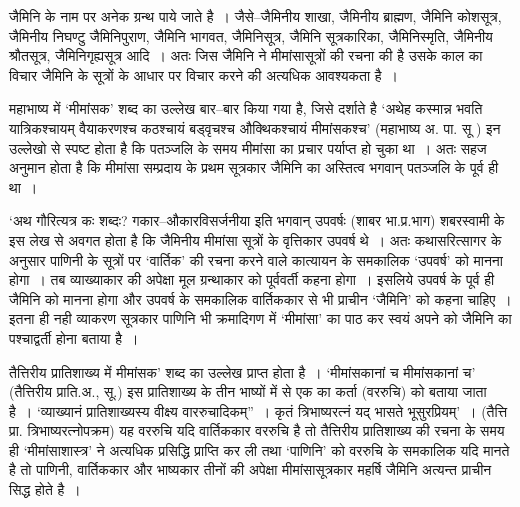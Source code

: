 जैमिनि के नाम पर अनेक ग्रन्थ पाये जाते है~। जैसे–जैमिनीय शाखा, जैमिनीय ब्राह्मण, जैमिनि कोशसूत्र, जैमिनीय निघण्टु जैमिनिपुराण, जैमिनि भागवत, जैमिनिसूत्र, जैमिनि सूत्रकारिका, जैमिनिस्मृति, जैमिनीय श्रौतसूत्र, जैमिनिगृह्यसूत्र आदि~। अतः जिस जैमिनि ने मीमांसासूत्रों की रचना की है उसके काल का विचार जैमिनि के सूत्रों के आधार पर विचार करने की अत्यधिक आवश्यकता है~। 

महाभाष्य में ‘मीमांसक' शब्द का उल्लेख बार–बार किया गया है, जिसे दर्शाते है ‘अथेह कस्मान्न भवति यात्रिकश्चायम् वैयाकरणश्च कठश्चायं बड्वृचश्च औक्थिकश्चायं मीमांसकश्च' (महाभाष्य अ. पा. सू ) इन उल्लेखो से स्पष्ट होता है कि पतञ्जलि के समय मीमांसा का प्रचार पर्याप्त हो चुका था~। अतः सहज अनुमान होता है कि मीमांसा सम्प्रदाय के प्रथम सूत्रकार जैमिनि का अस्तित्व भगवान् पतञ्जलि के पूर्व ही था~।

‘अथ गौरित्यत्र कः शब्दः? गकार–औकारविसर्जनीया इति भगवान् उपवर्षः (शाबर भा.प्र.भाग) शबरस्वामी के इस लेख से अवगत होता है कि जैमिनीय मीमांसा सूत्रों के वृत्तिकार उपवर्ष थे~। अतः कथासरित्सागर के अनुसार पाणिनी के सूत्रों पर ‘वार्तिक' की रचना करने वाले कात्यायन के समकालिक ‘उपवर्ष' को मानना होगा~। तब व्याख्याकार की अपेक्षा मूल ग्रन्थाकार को पूर्ववर्ती कहना होगा~। इसलिये उपवर्ष के पूर्व ही जैमिनि को मानना होगा और उपवर्ष के समकालिक वार्तिककार से भी प्राचीन ‘जैमिनि' को कहना चाहिए~। इतना ही नही व्याकरण सूत्रकार पाणिनि भी क्रमादिगण में ‘मीमांसा' का पाठ कर स्वयं अपने को जैमिनि का पश्चाद्वर्ती होना बताया है~।

तैत्तिरीय प्रातिशाख्य में मीमांसक' शब्द का उल्लेख प्राप्त होता है~। ‘मीमांसकानां च मीमांसकानां च' (तैत्तिरीय प्राति.अ., सू.) इस प्रातिशाख्य के तीन भाष्यों में से एक का कर्ता (वररुचि) को बताया जाता है~। ‘व्याख्यानं प्रातिशाख्यस्य वीक्ष्य वाररुचादिकम्”~। कृतं त्रिभाष्यरत्नं यद् भासते भूसुरप्रियम्'~। (तैत्ति प्रा. त्रिभाष्यरत्नोपक्रम) यह वररुचि यदि वार्तिककार वररुचि है तो तैत्तिरीय प्रातिशाख्य की रचना के समय ही ‘मीमांसाशास्त्र' ने अत्यधिक प्रसिद्धि प्राप्ति कर ली तथा ‘पाणिनि' को वररुचि के समकालिक यदि मानते है तो पाणिनी, वार्तिककार और भाष्यकार तीनों की अपेक्षा मीमांसासूत्रकार महर्षि जैमिनि अत्यन्त प्राचीन सिद्ध होते है~।

